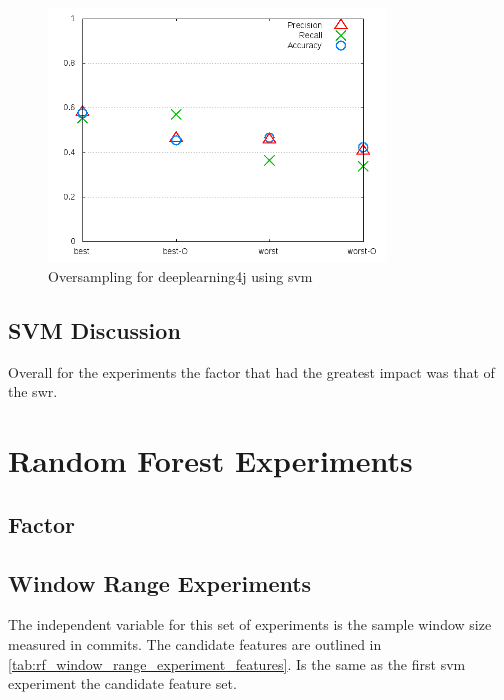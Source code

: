 \begin{figure}[!h]
    \centering
        \includegraphics[width=0.8\textwidth]{images/svm/test_4/deeplearning4j_sample_range}
    \caption{Oversampling for deeplearning4j using \gls{svm}}
    \label{fig:test_4_deeplearning4j_svm}
\end{figure}

\subsection{SVM Discussion}
\label{subsec:svm_discussion}

Overall for the experiments the factor that had the greatest impact was that of the \gls{swr}.

\section{Random Forest Experiments}
\label{sec:rf_experiments}

\subsection{Factor}

\subsection{Window Range Experiments}
\label{sec:rf_swr_experiment}

The independent variable for this set of experiments is the sample window size measured in commits. The candidate features are outlined in \autoref{tab:rf_window_range_experiment_features}. Is the same as the first \gls{svm} experiment the candidate feature set.

